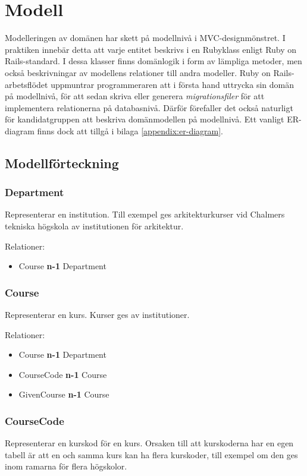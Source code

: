 \section{Modell}
\label{section:modell}

Modelleringen av domänen har skett på modellnivå i MVC-designmönstret. 
I praktiken innebär detta att varje entitet beskrivs i en Rubyklass enligt Ruby on Rails-standard.
I dessa klasser finns domänlogik i form av lämpliga metoder, men också beskrivningar av 
modellens relationer till andra modeller.
Ruby on Rails-arbetsflödet uppmuntrar programmeraren att i första hand uttrycka sin domän på modellnivå,
för att sedan skriva eller generera \emph{migrationsfiler} för att implementera relationerna på databasnivå.
Därför förefaller det också naturligt för kandidatgruppen att beskriva domänmodellen på modellnivå.
Ett vanligt ER-diagram finns dock att tillgå i bilaga \ref{appendix:er-diagram}.

\subsection{Modellförteckning}
\subsubsection{Department}
Representerar en institution. Till exempel ges arkitekturkurser vid Chalmers tekniska högskola av institutionen för arkitektur.

Relationer:
\begin{itemize}
  \item Course {\bf n-1} Department
\end{itemize}


\subsubsection{Course}
Representerar en kurs. Kurser ges av institutioner.

Relationer:
\begin{itemize}
	\item Course {\bf n-1} Department
	\item CourseCode {\bf n-1} Course
	\item GivenCourse {\bf n-1} Course
\end{itemize}


\subsubsection{CourseCode}
Representerar en kurskod för en kurs. Orsaken till att kurskoderna har en egen tabell är att en och samma kurs kan ha flera kurskoder, till exempel om den ges inom ramarna för flera högskolor.

